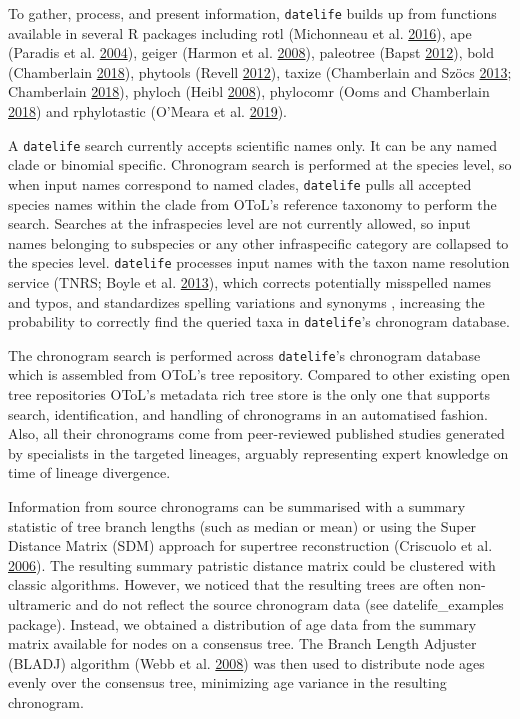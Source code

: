 \documentclass[]{article}
\begin{document}
To gather, process, and present information, \texttt{datelife} builds up from functions
available in several R packages including rotl (Michonneau et al. \protect\hyperlink{ref-Michonneau2016}{2016}), ape (Paradis et al. \protect\hyperlink{ref-Paradis2004}{2004}),
geiger (Harmon et al. \protect\hyperlink{ref-Harmon2008}{2008}), paleotree (Bapst \protect\hyperlink{ref-Bapst2012a}{2012}), bold (Chamberlain \protect\hyperlink{ref-Chamberlain2018}{2018}), phytools (Revell \protect\hyperlink{ref-Revell2012}{2012}), taxize (Chamberlain and Szöcs \protect\hyperlink{ref-Chamberlain2013}{2013}; Chamberlain \protect\hyperlink{ref-Chamberlain2018}{2018}), phyloch (Heibl \protect\hyperlink{ref-Heibl2008}{2008}), phylocomr (Ooms and Chamberlain \protect\hyperlink{ref-Ooms2018}{2018}) and rphylotastic (O'Meara et al. \protect\hyperlink{ref-Omeara2019}{2019}).

A \texttt{datelife} search currently accepts scientific names only. It can be any named clade or binomial specific.
Chronogram search is performed at the species level, so when input names correspond
to named clades, \texttt{datelife} pulls all accepted species names within the
clade from OToL's reference taxonomy to perform the search.
Searches at the infraspecies level are not currently allowed, so input names belonging to subspecies or any other infraspecific category are collapsed to the species level.
\texttt{datelife} processes input names with the taxon name resolution service (TNRS; Boyle et al. \protect\hyperlink{ref-Boyle2013}{2013}),
which corrects potentially misspelled names and typos, and standardizes spelling
variations and synonyms , increasing the probability to correctly find the
queried taxa in \texttt{datelife}'s chronogram database.

The chronogram search is performed across \texttt{datelife}'s chronogram database which is assembled from OToL's tree repository. Compared to other existing open tree repositories OToL's metadata rich tree store is the only one that supports search, identification, and handling of chronograms in an automatised fashion. Also, all their chronograms come from peer-reviewed published studies generated by specialists in the targeted lineages, arguably representing expert knowledge on time of lineage divergence.

Information from source chronograms can be summarised with a summary statistic of tree branch
lengths (such as median or mean) or using the Super Distance Matrix (SDM) approach for supertree reconstruction (Criscuolo et al. \protect\hyperlink{ref-Criscuolo2006}{2006}).
The resulting summary patristic distance matrix could be clustered with classic algorithms. However, we noticed that the resulting trees are often non-ultrameric and do not reflect the source chronogram data (see datelife\_examples package). Instead, we obtained a distribution of age data from the summary matrix available for nodes on a consensus tree. The Branch Length Adjuster (BLADJ) algorithm (Webb et al. \protect\hyperlink{ref-Webb2008}{2008}) was then used to distribute node ages evenly over the consensus tree, minimizing age variance in the resulting chronogram.
\end{document}
